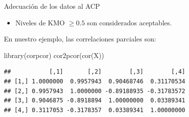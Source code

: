 \documentclass[
  ignorenonframetext,
]{beamer}
\newenvironment{Shaded}{\begin{snugshade}}{\end{snugshade}}
\newcommand{\FunctionTok}[1]{\textcolor[rgb]{0.00,0.00,0.00}{#1}}
\newcommand{\NormalTok}[1]{#1}
\providecommand{\tightlist}{%
  \setlength{\itemsep}{0pt}\setlength{\parskip}{0pt}}
\begin{document}
\begin{frame}[fragile]{Adecuación de los datos al ACP}
\protect\hypertarget{adecuaciuxf3n-de-los-datos-al-acp-2}{}
\begin{itemize}
\tightlist
\item
  Niveles de KMO \(\geq 0.5\) son considerados aceptables.
\end{itemize}

En nuestro ejemplo, las correlaciones parciales son:

\begin{Shaded}
\begin{Highlighting}[]
\FunctionTok{library}\NormalTok{(corpcor)}
\FunctionTok{cor2pcor}\NormalTok{(}\FunctionTok{cor}\NormalTok{(X))}
\end{Highlighting}
\end{Shaded}

\begin{verbatim}
##           [,1]       [,2]        [,3]        [,4]
## [1,] 1.0000000  0.9957943  0.90468746  0.31170534
## [2,] 0.9957943  1.0000000 -0.89188935 -0.31783572
## [3,] 0.9046875 -0.8918894  1.00000000  0.03389341
## [4,] 0.3117053 -0.3178357  0.03389341  1.00000000
\end{verbatim}
\end{frame}
\end{document}
